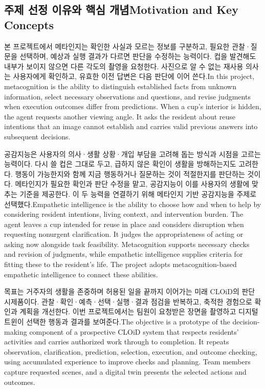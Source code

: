 \documentclass[conference,a4paper]{IEEEtran}
\newcommand{\bi}[2]{\ifKorean#1\else#2\fi}
\begin{document}
\subsection{\bi{주제 선정 이유와 핵심 개념}{Motivation and Key Concepts}}
\bi{본 프로젝트에서 메타인지는 확인한 사실과 모르는 정보를 구분하고, 필요한 관찰·질문을 선택하며, 예상과 실행 결과가 다르면 판단을 수정하는 능력이다. 컵을 발견해도 내부가 보이지 않으면 다른 각도의 촬영을 요청한다. 사진으로 알 수 없는 재사용 의사는 사용자에게 확인하고, 유효한 이전 답변은 다음 판단에 이어 쓴다.}{In this project, metacognition is the ability to distinguish established facts from unknown information, select necessary observations and questions, and revise judgments when execution outcomes differ from predictions. When a cup's interior is hidden, the agent requests another viewing angle. It asks the resident about reuse intentions that an image cannot establish and carries valid previous answers into subsequent decisions.}

\bi{공감지능은 사용자의 의사·생활 상황·개입 부담을 고려해 돕는 방식과 시점을 고르는 능력이다. 다시 쓸 컵은 그대로 두고, 급하지 않은 확인이 생활을 방해하는지도 고려한다. 행동이 가능한지와 함께 지금 행동하거나 질문하는 것이 적절한지를 판단하는 것이다. 메타인지가 필요한 확인과 판단 수정을 맡고, 공감지능이 이를 사용자의 생활에 맞추는 기준을 제공한다. 이 두 능력을 연결하기 위해 메타인지 기반 공감지능을 주제로 선택했다.}{Empathetic intelligence is the ability to choose how and when to help by considering resident intentions, living context, and intervention burden. The agent leaves a cup intended for reuse in place and considers disruption when requesting nonurgent clarification. It judges the appropriateness of acting or asking now alongside task feasibility. Metacognition supports necessary checks and revision of judgments, while empathetic intelligence supplies criteria for fitting these to the resident's life. The project adopts metacognition-based empathetic intelligence to connect these abilities.}

\bi{목표는 거주자의 생활을 존중하며 허용된 일을 끝까지 이어가는 미래 CLOiD의 판단 시제품이다. 관찰·확인·예측·선택·실행·결과 점검을 반복하고, 축적한 경험으로 확인과 계획을 개선한다. 이번 프로젝트에서는 팀원이 요청받은 장면을 촬영하고 디지털 트윈이 선택한 행동과 결과를 보여준다.}{The objective is a prototype of the decision-making component of a prospective CLOiD system that respects residents' activities and carries authorized work through to completion. It repeats observation, clarification, prediction, selection, execution, and outcome checking, using accumulated experience to improve checks and planning. Team members capture requested scenes, and a digital twin presents the selected actions and outcomes.}
\end{document}
